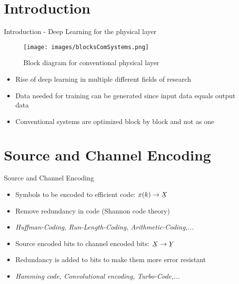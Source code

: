 \documentclass[xcolor=table,mathserif,9pt]{beamer}    %
\newcommand{\ubar}[1]{\underaccent{\bar}{#1}}
\begin{document}
\section{Introduction}%
\label{sec:introduction}
\begin{frame}{Introduction - Deep Learning for the physical layer}

\begin{figure}[htpb]
	\centering
	\texttt{[image: images/blocksComSystems.png]}
	\caption{Block diagram for conventional physical layer \cite{CommTech}}
\end{figure}

\vspace{1em}
\begin{itemize}
	\item Rise of deep learning in multiple different fields of research
	\item Data needed for training can be generated since input data equals output data
	\item Conventional systems are optimized block by block and not as one
\end{itemize}


\end{frame}

\section{Source and Channel Encoding}%
\begin{frame}{Source and Channel Encoding}

\vspace{1em}
\begin{itemize}
	\item Symbols to be encoded to efficient code: $x(k) \to \ubar{X}$
	\item Remove redundancy in code (Shannon code theory)
	\item \emph{Huffman-Coding, Run-Length-Coding, Arithmetic-Coding,...}
\end{itemize}

\vspace{2em}

\vspace{1em}
\begin{itemize}
	\item Source encoded bits to channel encoded bits: $\ubar{X} \to \ubar{Y}$
	\item Redundancy is added to bits to make them more error resistant
	\item \emph{Hamming code, Convolutional encoding, Turbo-Code,...}
\end{itemize}

\end{frame}
\end{document}
